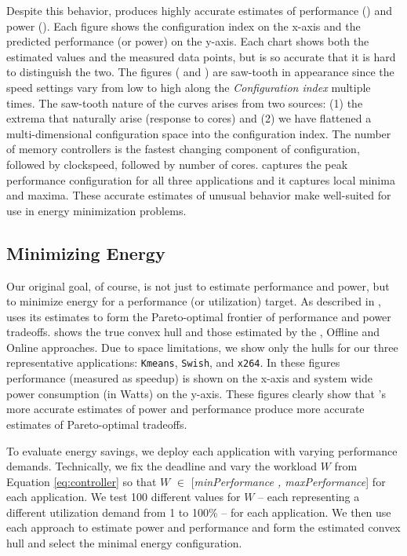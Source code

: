 Despite this behavior, \SYSTEMLEO{} produces highly accurate estimates of
performance () and power ().  Each
figure shows the configuration index on the x-axis and the predicted
performance (or power) on the y-axis.  Each chart shows both the
estimated values and the measured data points, but \SYSTEMLEO{} is so
accurate that it is hard to distinguish the two. The figures
( and  ) are saw-tooth in
appearance since the speed settings vary from low to high along the
\textit{Configuration index} multiple times. The saw-tooth nature of
the curves arises from two sources: (1) the extrema that naturally
arise (\eg response to cores) and (2) we have flattened a
multi-dimensional configuration space into the configuration index.
The number of memory controllers is the fastest changing component of
configuration, followed by clockspeed, followed by number of cores.
\SYSTEMLEO{} captures the peak performance configuration for all three
applications and it captures local minima and maxima.  These accurate
estimates of unusual behavior make \SYSTEMLEO{} well-suited for use in
energy minimization problems.

\subsection{Minimizing Energy}
\label{sec:experiment:LP}
Our original goal, of course, is not just to estimate performance and
power, but to minimize energy for a performance (or utilization)
target.  As described in , \SYSTEMLEO{} uses its estimates to
form the Pareto-optimal frontier of performance and power tradeoffs.
 shows the true convex hull and those estimated by
the \SYSTEMLEO{}, Offline and Online approaches.  Due to space
limitations, we show only the hulls for our three representative
applications: \texttt{Kmeans}, \texttt{Swish}, and \texttt{x264}.  In
these figures performance (measured as speedup) is shown on the x-axis
and system wide power consumption (in Watts) on the y-axis.  These
figures clearly show that \SYSTEMLEO{}'s more accurate estimates of power
and performance produce more accurate estimates of Pareto-optimal
tradeoffs.

To evaluate energy savings, we deploy each application with varying
performance demands.  Technically, we fix the deadline and vary the
workload $W$ from Equation \ref{eq:controller} so that $W$ $\in$
[\textit{minPerformance , maxPerformance}] for each application.  We test 100
different values for $W$ -- each representing a different utilization
demand from 1 to 100\% -- for each application.  We then use each
approach to estimate power and performance and form the estimated
convex hull and select the minimal energy configuration.

